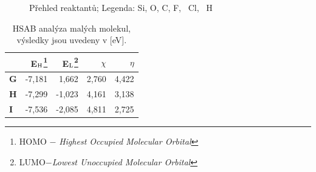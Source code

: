 \documentclass[
digital, %
table,   %
lof,     %
lot,     %
oneside,
]{fithesis3}
\begin{document}
\begin{figure}
\centering
{}
\caption{Přehled reaktantů; Legenda:  Si,  O,  C,  F, ~Cl, ~H}
\label{prehled_male_modely}
\end{figure}

\begin{table}[htbp]\begin{minipage}{\textwidth}
\begin{center}\caption{HSAB analýza malých molekul, výsledky jsou uvedeny v [eV].}\begin{tabular}{|l|r|r|r|r|}
\hline
\label{hsab_small}& E$_{\ce{H}}$\footnote{HOMO $-$ \textit{Highest Occupied Molecular Orbital}}  & E$_{\ce{L}}$\footnote{LUMO$ - $\textit{Lowest Unoccupied Molecular Orbital}} & $\chi$  & $\eta$  \\ \hline
\textbf{G} & -7,181 & 1,662 & 2,760 & 4,422 \\ \hline
\textbf{H} & -7,299 & -1,023 & 4,161 & 3,138 \\ \hline
\textbf{I} & -7,536 & -2,085 & 4,811 & 2,725 \\ \hline
\end{tabular}
\end{center}\end{minipage}
\end{table}
\end{document}

